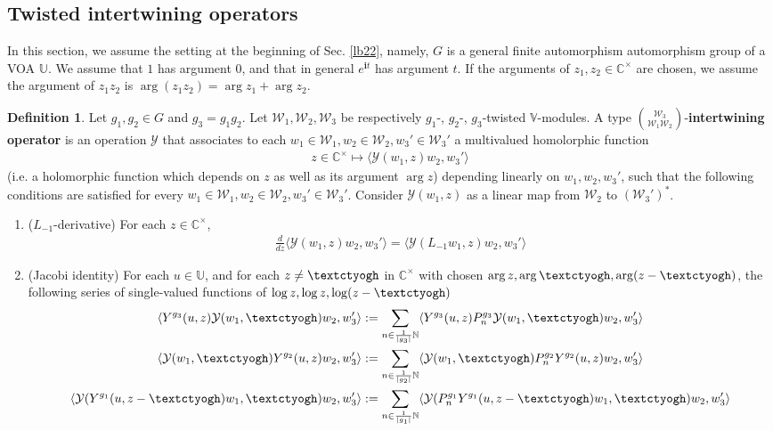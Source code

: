 \documentclass[12pt,a4paper,notitlepage]{article}
\theoremstyle{definition}
\newtheorem{df}{Definition}[subsection]
\theoremstyle{plain}
\newcommand{\mc}{\mathcal}
\newcommand{\bk}[1]{\langle {#1}\rangle}
\newcommand{\im}{\mathbf{i}}
\newcommand{\Vbb}{\mathbb V}
\newcommand{\Ubb}{\mathbb U}
\newcommand{\Cbb}{\mathbb C}
\newcommand{\Nbb}{\mathbb N}
\newcommand{\tipaz}{\text{\textctyogh}}
\numberwithin{equation}{subsection}
\begin{document}
\subsection{Twisted intertwining operators}


In this section, we assume the setting at the beginning of Sec. \ref{lb22}, namely, $G$ is a general finite automorphism automorphism group of a VOA $\Ubb$. We assume that $1$ has argument $0$, and that in general $e^{\im t}$ has argument $t$. If the arguments of $z_1,z_2\in\Cbb^\times$ are chosen, we assume the argument of $z_1z_2$ is $\arg(z_1z_2)=\arg z_1+\arg z_2$.


\begin{df}\label{lb51}
Let $g_1,g_2\in G$ and $g_3=g_1g_2$. Let $\mc W_1,\mc W_2,\mc W_3$ be respectively $g_1$-,  $g_2$-, $g_3$-twisted $\Vbb$-modules. A type $\mc W_3\choose\mc W_1\mc W_2$-\textbf{intertwining operator} is an operation $\mc Y$ that associates to each $w_1\in\mc W_1,w_2\in\mc W_2,w_3'\in\mc W_3'$ a multivalued homolorphic function
\begin{align*}
z\in\Cbb^\times\mapsto \bk{\mc Y(w_1,z)w_2,w_3'}	
\end{align*}
(i.e. a holomorphic function which depends on $z$ as well as its argument $\arg z$) depending linearly on $w_1,w_2,w_3'$, such that the following conditions are satisfied for every $w_1\in\mc W_1,w_2\in\mc W_2,w_3'\in\mc W_3'$. Consider $\mc Y(w_1,z)$ as a linear map from $\mc W_2$ to $(\mc W_3')^*$.
\begin{enumerate}
\item ($L_{-1}$-derivative)	For each $z\in\Cbb^\times$,
\begin{align}
\frac d{dz}\bk{\mc Y(w_1,z)w_2,w_3'}=\bk{\mc Y(L_{-1}w_1,z)w_2,w_3'}	\label{eq81}
\end{align}
\item (Jacobi identity)  For each $u\in\Ubb$, and for each $z\neq \tipaz$ in $\Cbb^\times$ with chosen $\arg z,\arg \tipaz,\arg(z-\tipaz)$, the following series of single-valued functions of $\log z,\log z,\log(z-\tipaz)$
\begin{gather}
	\bk{Y^{g_3}(u,z)\mc Y(w_1,\tipaz)w_2,w_3'}:=\sum_{n\in\frac 1{|g_3|}\Nbb}	\bk{Y^{g_3}(u,z)P_n^{g_3}\mc Y(w_1,\tipaz)w_2,w_3'}\label{eq76}\\
	\bk{\mc Y(w_1,\tipaz)Y^{g_2}(u,z)w_2,w_3'}:=\sum_{n\in\frac 1{|g_2|}\Nbb}	\bk{\mc Y(w_1,\tipaz)P_n^{g_2}Y^{g_2}(u,z)w_2,w_3'}\label{eq77}\\
	\bk{\mc Y(Y^{g_1}(u,z-\tipaz)w_1,\tipaz)w_2,w'_3}:=\sum_{n\in\frac 1{|g_1|}\Nbb}	\bk{\mc Y(P_n^{g_1}Y^{g_1}(u,z-\tipaz)w_1,\tipaz)w_2,w'_3}\label{eq78}

\end{gather}
\end{enumerate}
\end{df}
\end{document}
